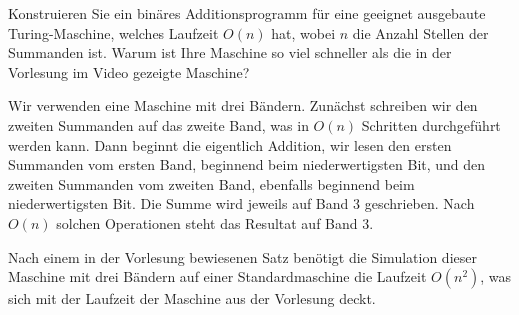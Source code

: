 Konstruieren Sie ein binäres Additionsprogramm für eine geeignet
ausgebaute Turing-Maschine, welches Laufzeit
$O(n)$ hat, wobei $n$ die Anzahl Stellen der Summanden ist.
Warum ist Ihre Maschine so viel schneller als die in der Vorlesung
im Video gezeigte Maschine?

\begin{loesung}
Wir verwenden eine Maschine mit drei Bändern. Zunächst schreiben
wir den zweiten Summanden auf das zweite Band, was in $O(n)$
Schritten durchgeführt werden kann.
Dann beginnt die
eigentlich Addition, wir lesen den ersten Summanden vom ersten Band,
beginnend beim niederwertigsten Bit, und den zweiten Summanden
vom zweiten Band, ebenfalls beginnend beim niederwertigsten Bit.
Die Summe wird jeweils auf Band 3 geschrieben. Nach $O(n)$
solchen Operationen steht das Resultat auf Band 3.

Nach einem in der Vorlesung bewiesenen Satz benötigt
die Simulation dieser Maschine mit drei Bändern auf einer Standardmaschine
die Laufzeit $O(n^2)$, was sich mit der Laufzeit der Maschine
aus der Vorlesung deckt.
\end{loesung}


